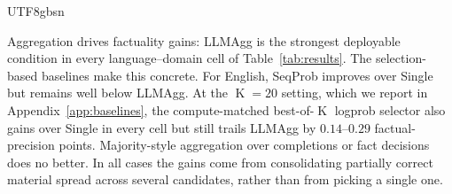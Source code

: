 \documentclass[11pt]{article}
\begin{document}
\begin{CJK*}{UTF8}{gbsn}



Aggregation drives factuality gains: LLMAgg is the strongest deployable condition in every language--domain cell of Table~\ref{tab:results}.
%
The selection-based baselines make this concrete.   For English, SeqProb improves over Single but remains well below LLMAgg. At the $\operatorname{K}\!=\!20$ setting, which we report in Appendix~\ref{app:baselines}, the compute-matched best-of-$\operatorname{K}$ logprob selector also gains over Single in every cell but still trails LLMAgg by $0.14$--$0.29$ factual-precision points. Majority-style aggregation over completions or fact decisions does no better. In all cases the gains come from consolidating partially correct material spread across several candidates, rather than from picking a single one.


\end{CJK*}
\end{document}

